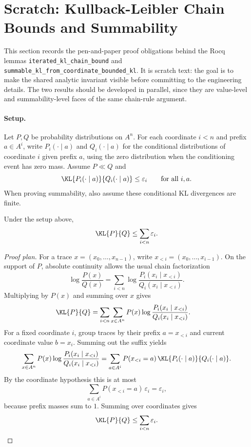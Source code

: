 \section{Scratch: Kullback-Leibler Chain Bounds and Summability}

This section records the pen-and-paper proof obligations behind the Rocq lemmas
\texttt{iterated\_kl\_chain\_bound} and
\texttt{summable\_kl\_from\_coordinate\_bounded\_kl}.  It is scratch text: the
goal is to make the shared analytic invariant visible before committing to the
engineering details.  The two results should be developed in parallel, since
they are value-level and summability-level faces of the same chain-rule
argument.

\paragraph{Setup.}
Let $P,Q$ be probability distributions on $A^n$.  For each coordinate $i<n$
and prefix $a\in A^i$, write $P_i(\cdot\mid a)$ and $Q_i(\cdot\mid a)$ for the
conditional distributions of coordinate $i$ given prefix $a$, using the zero
distribution when the conditioning event has zero mass.  Assume $P\ll Q$ and
\[
  \KL{P_i(\cdot \mid a)}{Q_i(\cdot \mid a)}
  \leq \varepsilon_i
  \qquad\text{for all } i,a.
\]
When proving summability, also assume these conditional KL divergences are
finite.

\begin{lemma}
Under the setup above,
\[
  \KL{P}{Q} \leq \sum_{i<n}\varepsilon_i.
\]
\end{lemma}

\begin{proof}[Proof plan]
For a trace $x=(x_0,\ldots,x_{n-1})$, write
$x_{<i}=(x_0,\ldots,x_{i-1})$.  On the support of $P$, absolute continuity
allows the usual chain factorization
\[
  \log\frac{P(x)}{Q(x)}
  =
  \sum_{i<n}
    \log
      \frac{P_i(x_i \mid x_{<i})}
           {Q_i(x_i \mid x_{<i})}.
\]
Multiplying by $P(x)$ and summing over $x$ gives
\[
\begin{aligned}
  \KL{P}{Q}
  &=
  \sum_{i<n}
  \sum_{x\in A^n}
    P(x)
    \log
      \frac{P_i(x_i \mid x_{<i})}
           {Q_i(x_i \mid x_{<i})}.
\end{aligned}
\]
For a fixed coordinate $i$, group traces by their prefix $a=x_{<i}$ and
current coordinate value $b=x_i$.  Summing out the suffix yields
\[
  \sum_{x\in A^n}
    P(x)
    \log
      \frac{P_i(x_i \mid x_{<i})}
           {Q_i(x_i \mid x_{<i})}
  =
  \sum_{a\in A^i} P(x_{<i}=a)\,
    \KL{P_i(\cdot\mid a)}{Q_i(\cdot\mid a)}.
\]
By the coordinate hypothesis this is at most
\[
  \sum_{a\in A^i} P(x_{<i}=a)\,\varepsilon_i
  =
  \varepsilon_i,
\]
because prefix masses sum to $1$.  Summing over coordinates gives
\[
  \KL{P}{Q}
  \leq
  \sum_{i<n}\varepsilon_i.
\]
\end{proof}

